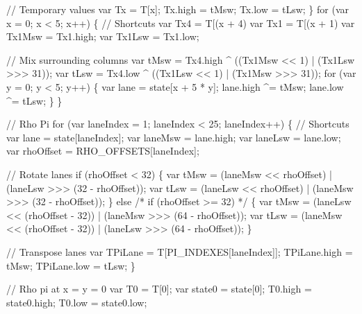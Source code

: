 \begin{DoxyCodeInclude}
                    \textcolor{comment}{// Temporary values}
                    var Tx = T[x];
                    Tx.high = tMsw;
                    Tx.low  = tLsw;
                \}
                \textcolor{keywordflow}{for} (var x = 0; x < 5; x++) \{
                    \textcolor{comment}{// Shortcuts}
                    var Tx4 = T[(x + 4) %
                    var Tx1 = T[(x + 1) %
                    var Tx1Msw = Tx1.high;
                    var Tx1Lsw = Tx1.low;

                    \textcolor{comment}{// Mix surrounding columns}
                    var tMsw = Tx4.high ^ ((Tx1Msw << 1) | (Tx1Lsw >>> 31));
                    var tLsw = Tx4.low  ^ ((Tx1Lsw << 1) | (Tx1Msw >>> 31));
                    \textcolor{keywordflow}{for} (var y = 0; y < 5; y++) \{
                        var lane = state[x + 5 * y];
                        lane.high ^= tMsw;
                        lane.low  ^= tLsw;
                    \}
                \}

                \textcolor{comment}{// Rho Pi}
                \textcolor{keywordflow}{for} (var laneIndex = 1; laneIndex < 25; laneIndex++) \{
                    \textcolor{comment}{// Shortcuts}
                    var lane = state[laneIndex];
                    var laneMsw = lane.high;
                    var laneLsw = lane.low;
                    var rhoOffset = RHO\_OFFSETS[laneIndex];

                    \textcolor{comment}{// Rotate lanes}
                    \textcolor{keywordflow}{if} (rhoOffset < 32) \{
                        var tMsw = (laneMsw << rhoOffset) | (laneLsw >>> (32 - rhoOffset));
                        var tLsw = (laneLsw << rhoOffset) | (laneMsw >>> (32 - rhoOffset));
                    \} \textcolor{keywordflow}{else} \textcolor{comment}{/* if (rhoOffset >= 32) */} \{
                        var tMsw = (laneLsw << (rhoOffset - 32)) | (laneMsw >>> (64 - rhoOffset));
                        var tLsw = (laneMsw << (rhoOffset - 32)) | (laneLsw >>> (64 - rhoOffset));
                    \}

                    \textcolor{comment}{// Transpose lanes}
                    var TPiLane = T[PI\_INDEXES[laneIndex]];
                    TPiLane.high = tMsw;
                    TPiLane.low  = tLsw;
                \}

                \textcolor{comment}{// Rho pi at x = y = 0}
                var T0 = T[0];
                var state0 = state[0];
                T0.high = state0.high;
                T0.low  = state0.low;


\end{DoxyCodeInclude}
